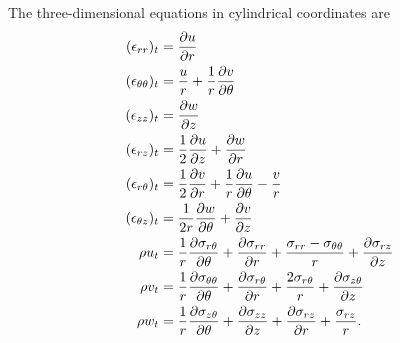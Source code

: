 \documentclass{article}
\begin{document}
The three-dimensional equations in cylindrical coordinates are
\begin{align}
(\epsilon_{rr})_t &= \frac{\partial u}{\partial r}\notag\\
(\epsilon_{\theta \theta})_t &= \frac{u}{r} + \frac{1}{r} \frac{\partial v}{\partial \theta}\notag\\
(\epsilon_{zz})_t &= \frac{\partial w}{\partial z}\notag\\
(\epsilon_{rz})_t &= \frac{1}{2} \frac{\partial u}{\partial z} + \frac{\partial w}{\partial r}\notag\\
(\epsilon_{r \theta})_t &= \frac{1}{2} \frac{\partial v}{\partial r} + \frac{1}{r} \frac{\partial u}{\partial \theta} - 
\frac{v}{r}\notag\\
(\epsilon_{\theta z})_t &= \frac{1}{2r} \frac{\partial w}{\partial \theta} + \frac{\partial v}{\partial z}\label{eqn:
3dcyllageul}\\
\rho u_t &= \frac{1}{r} \frac{\partial \sigma_{r \theta}}{\partial \theta} + \frac{\partial \sigma_{rr}}{\partial r} + 
\frac{\sigma_{rr} - \sigma_{\theta \theta}}{r} + \frac{\partial \sigma_{rz}}{\partial z}\notag\\
\rho v_t &= \frac{1}{r} \frac{\partial \sigma_{\theta \theta}}{\partial \theta} + \frac{\partial \sigma_{r \theta}}
{\partial r} + \frac{2 \sigma_{r \theta}}{r} + \frac{\partial \sigma_{z \theta}}{\partial z}\notag \\
\rho w_t &= \frac{1}{r} \frac{\partial \sigma_{z \theta}}{\partial \theta} + \frac{\partial \sigma_{zz}}{\partial z} 
+ \frac{\partial \sigma_{rz}}{\partial r} + \frac{\sigma_{rz}}{r}.\notag
\end{align}
\end{document}
